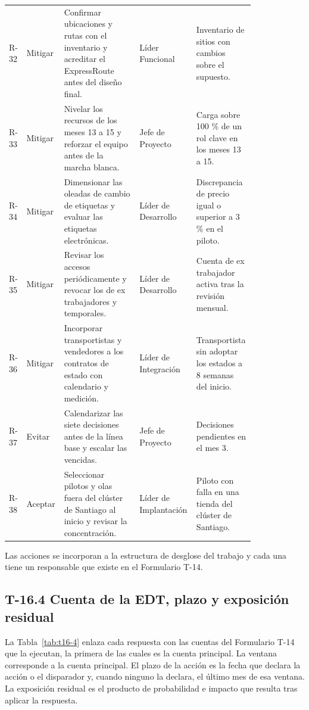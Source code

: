 \documentclass[11pt]{article}
\begin{document}
\begin{longtable}{p{0.060\linewidth}p{0.100\linewidth}p{0.300\linewidth}p{0.170\linewidth}p{0.190\linewidth}}
R-32 & Mitigar & Confirmar ubicaciones y rutas con el inventario y acreditar el ExpressRoute antes del diseño final. & Líder Funcional & Inventario de sitios con cambios sobre el supuesto. \\
R-33 & Mitigar & Nivelar los recursos de los meses 13 a 15 y reforzar el equipo antes de la marcha blanca. & Jefe de Proyecto & Carga sobre 100 \% de un rol clave en los meses 13 a 15. \\
R-34 & Mitigar & Dimensionar las oleadas de cambio de etiquetas y evaluar las etiquetas electrónicas. & Líder de Desarrollo & Discrepancia de precio igual o superior a 3 \% en el piloto. \\
R-35 & Mitigar & Revisar los accesos periódicamente y revocar los de ex trabajadores y temporales. & Líder de Desarrollo & Cuenta de ex trabajador activa tras la revisión mensual. \\
R-36 & Mitigar & Incorporar transportistas y vendedores a los contratos de estado con calendario y medición. & Líder de Integración & Transportista sin adoptar los estados a 8 semanas del inicio. \\
R-37 & Evitar & Calendarizar las siete decisiones antes de la línea base y escalar las vencidas. & Jefe de Proyecto & Decisiones pendientes en el mes 3. \\
R-38 & Aceptar & Seleccionar pilotos y olas fuera del clúster de Santiago al inicio y revisar la concentración. & Líder de Implantación & Piloto con falla en una tienda del clúster de Santiago. \\
\end{longtable}

Las acciones se incorporan a la estructura de desglose del trabajo y cada una tiene un responsable que existe en el Formulario T-14.

\subsection{T-16.4 Cuenta de la EDT, plazo y exposición residual}

La Tabla~\mbox{\ref{tab:t16-4}} enlaza cada respuesta con las cuentas del Formulario T-14 que la ejecutan, la primera de las cuales es la cuenta principal. La ventana corresponde a la cuenta principal. El plazo de la acción es la fecha que declara la acción o el disparador y, cuando ninguno la declara, el último mes de esa ventana. La exposición residual es el producto de probabilidad e impacto que resulta tras aplicar la respuesta.
\end{document}
